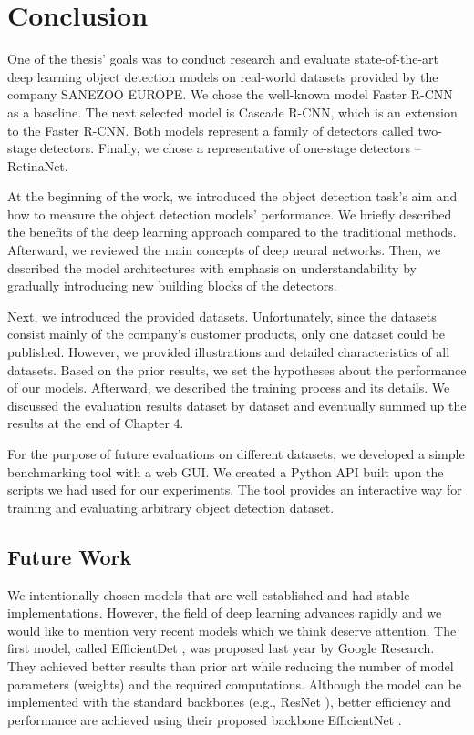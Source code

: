 \chapter{Conclusion}\label{chap:conclusion}

One of the thesis' goals was to conduct research and evaluate state-of-the-art
deep learning object detection models on real-world datasets provided by the
company SANEZOO EUROPE. We chose the well-known model Faster R-CNN as a
baseline. The next selected model is Cascade R-CNN, which is an extension to the
Faster R-CNN. Both models represent a family of detectors called two-stage
detectors. Finally, we chose a representative of one-stage detectors --
RetinaNet.

At the beginning of the work, we introduced the object detection task's aim and
how to measure the object detection models' performance. We briefly described
the benefits of the deep learning approach compared to the traditional methods.
Afterward, we reviewed the main concepts of deep neural networks. Then, we
described the model architectures with emphasis on understandability by
gradually introducing new building blocks of the detectors.

Next, we introduced the provided datasets. Unfortunately, since the
datasets consist mainly of the company's customer products, only one dataset
could be published. However, we provided illustrations and detailed
characteristics of all datasets. Based on the prior results, we set the hypotheses about
the performance of our models. Afterward, we described the training
process and its details. We discussed the evaluation results dataset by
dataset and eventually summed up the results at the end of Chapter 4.

For the purpose of future evaluations on different datasets, we developed
a simple benchmarking tool with a web GUI. We created a Python API built
upon the scripts we had used for our experiments. The tool provides an
interactive way for training and evaluating arbitrary object detection dataset.

\section{Future Work}
We intentionally chosen models that are well-established and had stable
implementations. However, the field of deep learning advances rapidly and we
would like to mention very recent models which we think deserve attention. The
first model, called EfficientDet \cite{efficientdet}, was proposed last year by
Google Research. They achieved better results than prior art while reducing the
number of model parameters (weights) and the required computations. Although the
model can be implemented with the standard backbones (e.g., ResNet
\cite{resnet}), better efficiency and performance are achieved using their
proposed backbone EfficientNet \cite{efficientnet}.

